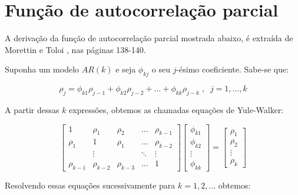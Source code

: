 
\chapter{Função de autocorrelação parcial}
\label{ap:facp}

A derivação da função de autocorrelação parcial mostrada abaixo, é extraída de Morettin e Toloi \citep{morettin}, nas páginas 138-140.

Suponha um modelo $AR(k)$ e seja $\phi_{kj}$ o seu $j$-ésimo coeficiente. Sabe-se que:

\[
\rho_j = \phi_{k1}\rho_{j-1} + \phi_{k2}\rho_{j-2} + \ldots + \phi_{kk}\rho_{j-k} \;,\;\;
j=1,\ldots,k
\]

A partir dessas $k$ expressões, obtemos as chamadas equações de Yule-Walker:

\begin{equation}\label{eq:yule}
\left[ \begin{array}{ccccc}
1 & \rho_1 & \rho_2 & \ldots & \rho_{k-1}\\
\rho_1 & 1 & \rho_1 & \ldots & \rho_{k-2}\\
 & \vdots &  & \ddots & \vdots\\
\rho_{k-1} & \rho_{k-2} & \rho_{k-3} & \ldots & 1
\end{array}  \right]
\left[ \begin{array}{c}
\phi_{k1}\\
\phi_{k2}\\
\vdots\\
\phi_{kk}
\end{array}  \right]
=
\left[ \begin{array}{c}
\rho_1\\
\rho_2\\
\vdots\\
\rho_k
\end{array}  \right]
\end{equation}

Resolvendo essas equações sucessivamente para $k=1, 2, \ldots$ obtemos:


